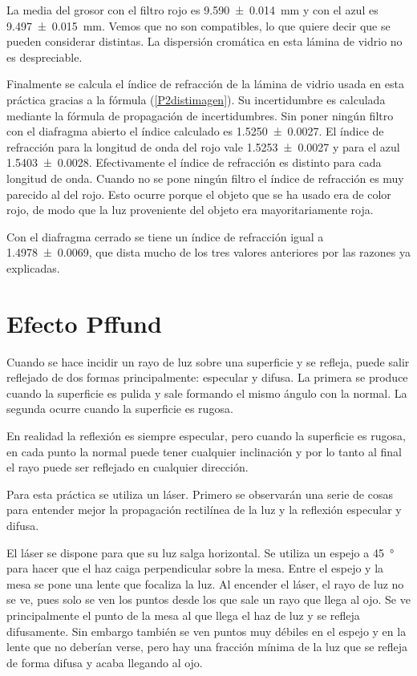 \documentclass[12pt]{article}
\numberwithin{table}{section}
\numberwithin{figure}{section}
\numberwithin{equation}{section}
\newcommand{\data}[3]{\SI{#1 \pm #2}{#3}}
\begin{document}
La media del grosor con el filtro rojo es \data{9.590}{0.014}{mm} y con el azul es \data{9.497}{0.015}{mm}. Vemos que no son compatibles, lo que quiere decir que se pueden considerar distintas. La dispersión cromática en esta lámina de vidrio no es despreciable.

Finalmente se calcula el índice de refracción de la lámina de vidrio usada en esta práctica gracias a la fórmula (\ref{P2distimagen}). Su incertidumbre es calculada mediante la fórmula de propagación de incertidumbres. Sin poner ningún filtro con el diafragma abierto el índice calculado es \num{1.5250\pm0.0027}. El índice de refracción para la longitud de onda del rojo vale \num{1.5253\pm0.0027} y para el azul \num{1.5403\pm0.0028}. Efectivamente el índice de refracción es distinto para cada longitud de onda. Cuando no se pone ningún filtro el índice de refracción es muy parecido al del rojo. Esto ocurre porque el objeto que se ha usado era de color rojo, de modo que la luz proveniente del objeto era mayoritariamente roja.

Con el diafragma cerrado se tiene un índice de refracción igual a \num{1.4978\pm0.0069}, que dista mucho de los tres valores anteriores por las razones ya explicadas.

\section{Efecto Pffund}
Cuando se hace incidir un rayo de luz sobre una superficie y se refleja, puede salir reflejado de dos formas principalmente: especular y difusa. La primera se produce cuando la superficie es pulida y sale formando el mismo ángulo con la normal. La segunda ocurre cuando la superficie es rugosa.

En realidad la reflexión es siempre especular, pero cuando la superficie es rugosa, en cada punto la normal puede tener cualquier inclinación y por lo tanto al final el rayo puede ser reflejado en cualquier dirección.

Para esta práctica se utiliza un láser. Primero se observarán una serie de cosas para entender mejor la propagación rectilínea de la luz y la reflexión especular y difusa.

El láser se dispone para que su luz salga horizontal. Se utiliza un espejo a \SI{45}{\degree} para hacer que el haz caiga perpendicular sobre la mesa. Entre el espejo y la mesa se pone una lente que focaliza la luz. Al encender el láser, el rayo de luz no se ve, pues solo se ven los puntos desde los que sale un rayo que llega al ojo. Se ve principalmente el punto de la mesa al que llega el haz de luz y se refleja difusamente. Sin embargo también se ven puntos muy débiles en el espejo y en la lente que no deberían verse, pero hay una fracción mínima de la luz que se refleja de forma difusa y acaba llegando al ojo.
\end{document}

